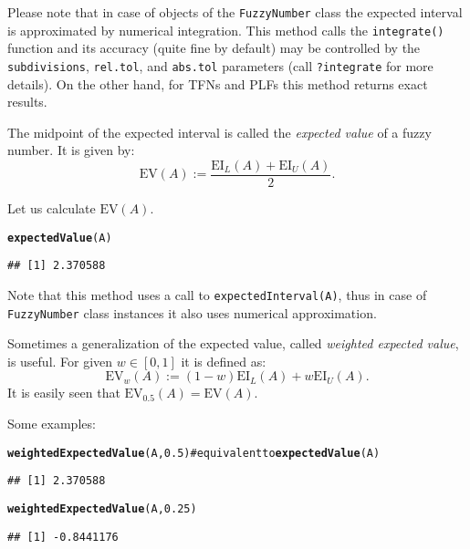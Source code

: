 \documentclass[11pt]{article}\usepackage{graphicx, color}
\makeatletter
\newcommand{\hlfunctioncall}[1]{\textcolor[rgb]{0.501960784313725,0,0.329411764705882}{\textbf{#1}}}%
\newcommand{\hlcomment}[1]{\textcolor[rgb]{0.180392156862745,0.6,0.341176470588235}{#1}}%
\newenvironment{kframe}{%
 \def\at@end@of@kframe{}%
 \ifinner\ifhmode%
  \def\at@end@of@kframe{\end{minipage}}%
  \begin{minipage}{\columnwidth}%
 \fi\fi%
 \def\FrameCommand##1{\hskip\@totalleftmargin \hskip-\fboxsep
 \colorbox{shadecolor}{##1}\hskip-\fboxsep
     \hskip-\linewidth \hskip-\@totalleftmargin \hskip\columnwidth}%
 \MakeFramed {\advance\hsize-\width
   \@totalleftmargin\z@ \linewidth\hsize
   \@setminipage}}%
 {\par\unskip\endMakeFramed%
 \at@end@of@kframe}
\newenvironment{knitrout}{}{} %
\makeatother
\begin{document}
\noindent
Please note that in case of objects of
the \texttt{FuzzyNumber} class the expected interval is approximated
by numerical integration. This method calls the \texttt{integrate()} function
and its accuracy (quite fine by default)
may be controlled by the \texttt{subdivisions},
\texttt{rel.tol}, and \texttt{abs.tol} parameters
(call \texttt{?integrate} for more details).
On the other hand, for TFNs and PLFs this method returns exact results.

\bigskip
The midpoint of the expected interval is called the \textit{expected value}
of a fuzzy number. It is given by:
\begin{equation}
\mathrm{EV}(A) := \frac{\mathrm{EI}_L(A) + \mathrm{EI}_U(A)}{2}.
\end{equation}

\noindent
Let us calculate $\mathrm{EV}(A)$.

\begin{knitrout}\small
{}\color{fgcolor}\begin{kframe}
\begin{alltt}
\hlfunctioncall{expectedValue}(A)
\end{alltt}
\begin{verbatim}
## [1] 2.370588
\end{verbatim}
\end{kframe}
\end{knitrout}


\noindent
Note that this method uses a call to \texttt{expectedInterval(A)},
thus in case of \texttt{FuzzyNumber} class instances it also uses
numerical approximation.

Sometimes a generalization of the expected value,
called \textit{weighted expected value}, is useful.
For given $w\in[0,1]$ it is defined as:
\begin{equation}
\mathrm{EV}_w(A) := (1-w)\mathrm{EI}_L(A) + w\mathrm{EI}_U(A).
\end{equation}
It is easily seen that $\mathrm{EV}_{0.5}(A)=\mathrm{EV}(A)$.

\noindent
Some examples:

\begin{knitrout}\small
{}\color{fgcolor}\begin{kframe}
\begin{alltt}
\hlfunctioncall{weightedExpectedValue}(A, 0.5) \hlcomment{# equivalent to \hlfunctioncall{expectedValue}(A)}
\end{alltt}
\begin{verbatim}
## [1] 2.370588
\end{verbatim}
\begin{alltt}
\hlfunctioncall{weightedExpectedValue}(A, 0.25)
\end{alltt}
\begin{verbatim}
## [1] -0.8441176
\end{verbatim}
\end{kframe}
\end{knitrout}
\end{document}
